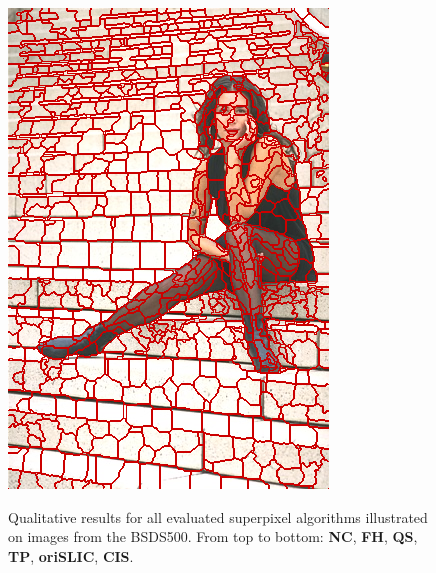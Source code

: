 \begin{figure}
{		\includegraphics[scale=\scalefivebsdtest]{pictures/bsd-test-7-cis}
	}
	\caption[Qualitative results for \textbf{NC} \cite{RenMalik:2003}, \textbf{FH} \cite{FelzenswalbHuttenlocher:2004}, \textbf{QS} \cite{VedaldiSoatto:2008}, \textbf{TP} \cite{LevinshteinStereKutulakosFleetDickinsonSiddiqi:2009}, \textbf{SLIC} \cite{AchantaShajiSmithLucchiFuaSuesstrunk:2010} and \textbf{CIS} \cite{VekslerBoykovMehrani:2010} illustrated on images from the Berkeley Segmentation Dataset \cite{ArbelaezMaireFowlkesMalik:2011}.]{Qualitative results for all evaluated superpixel algorithms illustrated on images from the BSDS500. From top to bottom: \textbf{NC}, \textbf{FH}, \textbf{QS}, \textbf{TP}, \textbf{oriSLIC}, \textbf{CIS}.}
\end{figure}

